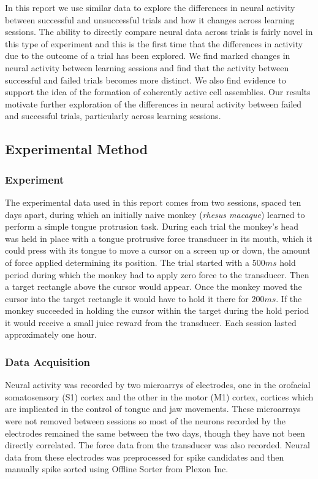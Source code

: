 \documentclass[11pt,a4paper]{article}
\begin{document}
In this report we use similar data to explore the differences in neural activity between successful and unsuccessful trials and how it changes across learning sessions. The ability to directly compare neural data across trials is fairly novel in this type of experiment and this is the first time that the differences in activity due to the outcome of a trial has been explored. We find marked changes in neural activity between learning sessions and find that the activity between successful and failed trials becomes more distinct. We also find evidence to support the idea of the formation of coherently active cell assemblies. Our results motivate further exploration of the differences in neural activity between failed and successful trials, particularly across learning sessions.

\subsection{Experimental Method}
\subsubsection{Experiment}
The experimental data used in this report comes from two sessions, spaced ten days apart, during which an initially naive monkey (\emph{rhesus macaque}) learned to perform a simple tongue protrusion task. During each trial the monkey's head was held in place with a tongue protrusive force transducer in its mouth, which it could press with its tongue to move a cursor on a screen up or down, the amount of force applied determining its position. The trial started with a $500ms$ hold period during which the monkey had to apply zero force to the transducer. Then a target rectangle above the cursor would appear. Once the monkey moved the cursor into the target rectangle it would have to hold it there for $200ms$. If the monkey succeeded in holding the cursor within the target during the hold period it would receive a small juice reward from the transducer. Each session lasted approximately one hour.

\subsubsection{Data Acquisition}
Neural activity was recorded by two microarrys of electrodes, one in the orofacial somatosensory (S1) cortex and the other in the motor (M1) cortex, cortices which are implicated in the control of tongue and jaw movements. These microarrays were not removed between sessions so most of the neurons recorded by the electrodes remained the same between the two days, though they have not been directly correlated. The force data from the transducer was also recorded. Neural data from these electrodes was preprocessed for spike candidates and then manually spike sorted using Offline Sorter from Plexon Inc. 
\end{document}
